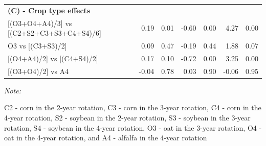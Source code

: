 \documentclass[
]{article}
\begin{document}
\begin{table}
\begin{threeparttable}
\begin{tabular}[t]{lrrrlrr}
\multicolumn{7}{l}{\textbf{(C) - Crop type effects}}\\
\hspace{1em}{}[(O3+O4+A4)/3] vs [(C2+S2+C3+S3+C4+S4)/6] & 0.19 & 0.01 & -0.60 & 0.00 & 4.27 & 0.00\\
\hspace{1em}O3 vs [(C3+S3)/2] & 0.09 & 0.47 & -0.19 & 0.44 & 1.88 & 0.07\\
\hspace{1em}{}[(O4+A4)/2] vs [(C4+S4)/2] & 0.17 & 0.10 & -0.72 & 0.00 & 3.25 & 0.00\\
\hspace{1em}{}[(O3+O4)/2] vs A4 & -0.04 & 0.78 & 0.03 & 0.90 & -0.06 & 0.95\\
\bottomrule
\end{tabular}
\begin{tablenotes}[para]
\item \textit{Note: } 
\item C2 - corn in the 2-year rotation, C3 - corn in the 3-year rotation, C4 - corn in the 4-year rotation, S2 - soybean in the 2-year rotation, S3 - soybean in the 3-year rotation, S4 - soybean in the 4-year rotation, O3 - oat in the 3-year rotation, O4 - oat in the 4-year rotation, and A4 - alfalfa in the 4-year rotation
\end{tablenotes}
\end{threeparttable}
\end{table}
\end{document}
